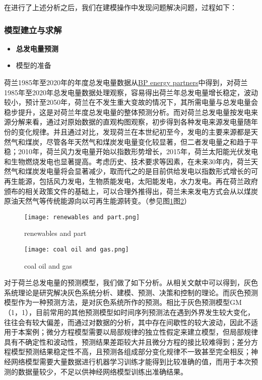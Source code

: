 \documentclass[bwprint]{gmcmthesis}
\numberwithin{figure}{section}
\begin{document}
在进行了上述分析之后，我们在建模操作中发现问题解决问题，过程如下：
\subsubsection{模型建立与求解}
\begin{itemize}
	\item \textbf{总发电量预测}
\end{itemize}

\begin{itemize}
	\item 模型的准备
\end{itemize}

荷兰1985年至2020年的年度总发电量数据从\href{http://www.bp.com/statisticalreview}{BP energy partners}中得到，对荷兰1985年至2020年总发电量数据处理观察，容易得出荷兰年总发电量增长稳定，波动较小，预计至2050年，荷兰在不发生重大变故的情况下，其所需电量与总发电量会稳步提升，这是对荷兰年度总发电量的整体预测分析。而对荷兰总发电量按发电来源分解来看，通过对原始数据的直观构图观察，初步得到各种发电来源发电量随年份的变化规律。并且通过对比，发现荷兰在本世纪初至今，发电的主要来源都是天然气和煤炭，尽管各年天然气和煤炭发电量变化较显著，但二者发电量之和趋于平稳；2010年，荷兰风力发电量开始以指数形势增长，2015年，荷兰太阳能光伏发电和生物燃烧发电也显著提高。考虑历史、技术要求等因素，在未来30年内，荷兰天然气和煤炭发电量将会显著减少，取而代之的是目前供给发电以指数形式增长的可再生能源，包括风力发电，生物质能发电，太阳能发电，水力发电。再在荷兰政府颁布的相关政策文件的基础上，可以合理外推得出，荷兰未来发电方式会从以煤炭原油天然气等传统能源向以可再生能源转变。（参见图\ref{fig_1}图\ref{fig_2}）

\begin{figure}[!h]
	\centering
	\texttt{[image: renewables and part.png]}
	\caption{renewables and part}
	\label{fig_1}
\end{figure}

\begin{figure}[!h]
	\centering
	\texttt{[image: coal oil and gas.png]}
	\caption{coal oil and gas}
	\label{fig_2}
\end{figure}

对于荷兰总发电量的预测模型，我们做了如下分析。从相关文献中可以得到，灰色系统理论是研究解决灰色系统分析、建模、预测、决策和控制的理论。而灰色预测模型作为一种预测方法，是对灰色系统所作的预测。相比于灰色预测模型GM（1，1），目前常用的其他预测模型如时间序列预测法在遇到外界发生较大变化，往往会有较大偏差，而通过对数据的分析，其中存在间歇性的较大波动，因此不适用于本案例；微分方程模型需要以局部规律的独立性假定来建立模型，但局部规律具有不确定性和波动性，预测结果差距较大并且微分方程的接比较难得到；差分方程模型预测结果稳定性不高，且预测各组成部分变化规律不一致甚至完全相反；神经网络模型需要大量数据进行机器学习训练才能得到比较准确的值，而用于本次预测的数据量较少，不足以供神经网络模型训练出准确结果。
\end{document}
